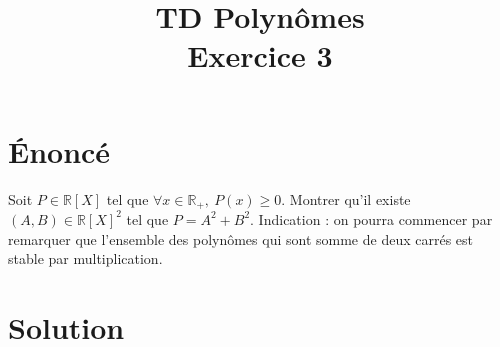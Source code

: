 \documentclass[french]{article}
\title{TD Polynômes \\ Exercice 3}
\date{}
\newcommand{\R}{\mathbb{R}}
\begin{document}
\maketitle

\section{Énoncé}
Soit $P\in\R[X]$ tel que $\forall x\in\R_+,\ P(x)\geqslant 0$. Montrer qu'il existe $(A,B)\in\R[X]^2$ tel que $P=A^2+B^2$. Indication : on pourra commencer par remarquer que l'ensemble des polynômes qui sont somme de deux carrés est stable par multiplication.
\section{Solution}
\end{document}
